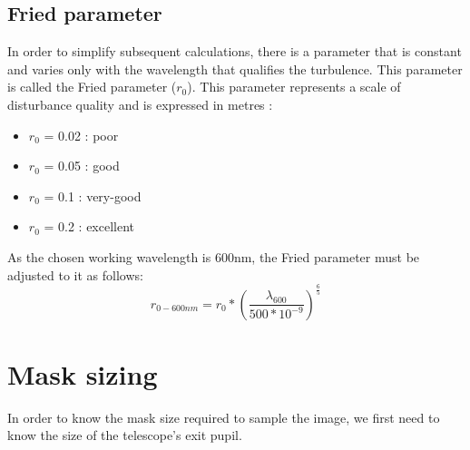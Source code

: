 \subsection{Fried parameter}
In order to simplify subsequent calculations, there is a parameter that is constant and varies only with the wavelength that qualifies the turbulence.
This parameter is called the Fried parameter ($r_0$).
This parameter represents a scale of disturbance quality and is expressed in metres :
\begin{itemize}
    \item $r_0$ = 0.02 : poor
    \item $r_0$ = 0.05 : good
    \item $r_0$ = 0.1 : very-good
    \item $r_0$ = 0.2 : excellent
\end{itemize}
As the chosen working wavelength is 600nm, the Fried parameter must be adjusted to it as follows:
\begin{equation}
    r_{0-600nm} = r_0*\left(\frac{\lambda_{600}}{500*10^{-9}}\right)^{\frac{6}{5}}
\end{equation}
\newpage
\section{Mask sizing}\label{sec:Opti_Couille}
In order to know the mask size required to sample the image, we first need to know the size of the telescope's exit pupil.
